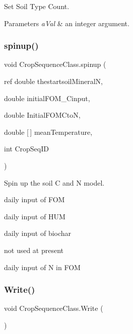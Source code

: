 Set Soil Type Count. 


\begin{DoxyParams}{Parameters}
{\em a\+Val} & an integer argument. \\
\hline
\end{DoxyParams}
\mbox{\label{class_crop_sequence_class_ae05480cc30f8329951f9cb63ecb6ced5}} 
\subsubsection{\texorpdfstring{spinup()}{spinup()}}
{\footnotesize\ttfamily void Crop\+Sequence\+Class.\+spinup (\begin{DoxyParamCaption}\item[{ref double}]{thestartsoil\+MineralN,  }\item[{double}]{initial\+F\+O\+M\+\_\+\+Cinput,  }\item[{double}]{Initial\+F\+O\+M\+CtoN,  }\item[{double \mbox{[}$\,$\mbox{]}}]{mean\+Temperature,  }\item[{int}]{Crop\+Seq\+ID }\end{DoxyParamCaption})\hspace{0.3cm}{\ttfamily [inline]}}



Spin up the soil C and N model. 

daily input of F\+OM

daily input of H\+UM

daily input of biochar

not used at present

daily input of N in F\+OM \mbox{\label{class_crop_sequence_class_aba8e1ea5cc4812106e2b2fbeb0d9b157}} 
\subsubsection{\texorpdfstring{Write()}{Write()}}
{\footnotesize\ttfamily void Crop\+Sequence\+Class.\+Write (\begin{DoxyParamCaption}{ }\end{DoxyParamCaption})\hspace{0.3cm}{\ttfamily [inline]}}



